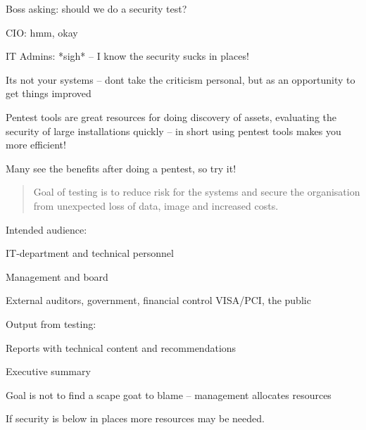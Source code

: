 \documentclass[Screen16to9,17pt]{foils}
\begin{document}
\begin{list2}
\item Boss asking: should we do a security test?
\item CIO: hmm, okay
\item IT Admins: *sigh* -- I know the security sucks in places!
\item Its not your systems -- dont take the criticism personal, but as an opportunity to get things improved
\vskip 1cm
\item Pentest tools are great resources for doing discovery of assets, evaluating the security of large installations quickly -- in short using pentest tools makes you more efficient!
\end{list2}

\centerline{\Large Many see the benefits after doing a pentest, so try it!}



\begin{quote}
Goal of testing is to reduce risk for the systems and secure the organisation\\ from unexpected loss of data, image and increased costs.
\end{quote}

\begin{list1}
\item Intended audience:
\begin{list2}
\item IT-department and technical personnel
\item Management and board
\item External auditors, government, financial control VISA/PCI, the public
\end{list2}
\item Output from testing:
\begin{list2}
\item Reports with technical content and recommendations
\item Executive summary
\end{list2}
\end{list1}

Goal is not to find a scape goat to blame -- management allocates resources

If security is below in places more resources may be needed.


\end{document}
